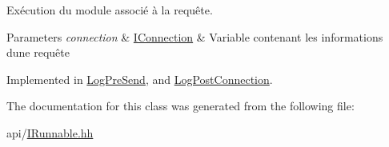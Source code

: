 Exécution du module associé à la requête. 


\begin{DoxyParams}{Parameters}
{\em connection} & \hyperlink{class_a_p_i_tree_friends_1_1_i_connection}{I\+Connection} \& Variable contenant les informations d\textquotesingle{}une requête \\
\hline
\end{DoxyParams}


Implemented in \hyperlink{class_log_pre_send_aef56513bfe060da02d63a86519c1e694}{Log\+Pre\+Send}, and \hyperlink{class_log_post_connection_a8c71f2051507093a74940bbf6f2c6a6b}{Log\+Post\+Connection}.



The documentation for this class was generated from the following file\+:\begin{DoxyCompactItemize}
\item 
api/\hyperlink{_i_runnable_8hh}{I\+Runnable.\+hh}\end{DoxyCompactItemize}
